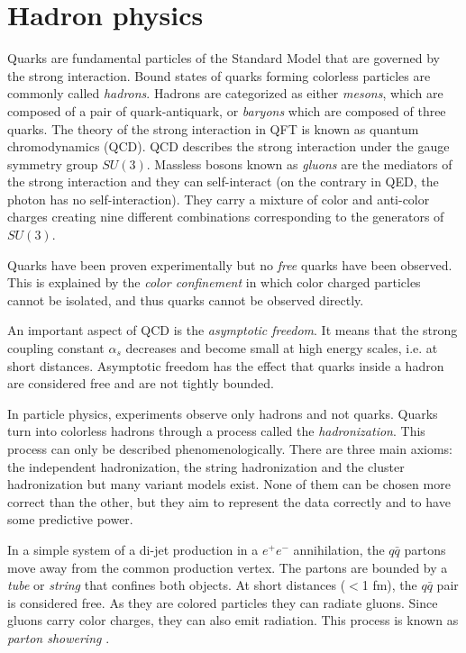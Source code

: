 \section{Hadron physics}
\label{sec:Hadrons}

Quarks are fundamental particles of the Standard Model that are governed by the strong interaction. Bound states of quarks forming colorless particles are commonly called \textit{hadrons}. Hadrons are categorized as either \textit{mesons}, which are composed of a pair of quark-antiquark, or \textit{baryons} which are composed of three quarks. The theory of the strong interaction in QFT is known as quantum chromodynamics (QCD). QCD describes the strong interaction under the gauge symmetry group $SU(3)$. Massless bosons known as \textit{gluons} are the mediators of the strong interaction and they can self-interact (on the contrary in QED, the photon has no self-interaction). They carry a mixture of color and anti-color charges creating nine different combinations corresponding to the generators of $SU(3)$.

Quarks have been proven experimentally but no \textit{free} quarks have been observed. This is explained by the \textit{color confinement} in which color charged particles cannot be isolated, and thus quarks cannot be observed directly.

An important aspect of QCD is the \textit{asymptotic freedom}. It means that the strong coupling constant $\alpha_s$ decreases and become small at high energy scales, i.e. at short distances. Asymptotic freedom has the effect that quarks inside a hadron are considered free and are not tightly bounded.

In particle physics, experiments observe only hadrons and not quarks. Quarks turn into colorless hadrons through a process called the \textit{hadronization}. This process can only be described phenomenologically. There are three main axioms: the independent hadronization, the string hadronization \cite{Artru1988} and the cluster hadronization \cite{Webber:1983if} but many variant models exist. None of them can be chosen more correct than the other, but they aim to represent the data correctly and to have some predictive power.

In a simple system of a di-jet production in a $e^+e^-$ annihilation, the $q\bar{q}$ partons move away from the common production vertex. The partons are bounded by a \textit{tube} or \textit{string} that confines both objects. At short distances ($<$1 fm), the $q\bar{q}$ pair is considered free. As they are colored particles they can radiate gluons. Since gluons carry color charges, they can also emit radiation. This process is known as \textit{parton showering} \cite{Feynman:1969wa}.

